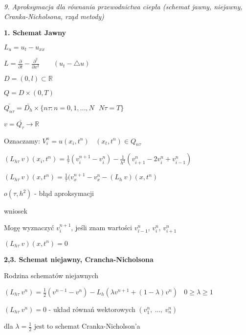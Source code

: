 \textit{9. Aproksymacja dla równania przewodnictwa ciepła (schemat jawny, niejawny, Cranka-Nicholsona, rząd metody)}

\textbf{1. Schemat Jawny}

$L_u = u_t - u_{xx}$

$L = \frac{\partial}{\partial t} - \frac{\partial^2}{\partial x^2}\ \ \ \ \ \ \ \ \ (u_t - \bigtriangleup u)$

$D = (0,l) \subset \mathbb{R}$

$Q = D \times (0,T)$

$\bar{Q_{n\tau}} = \bar{D_h} \times \{ n\tau : n = 0, 1, ..., N\ \ \ N\tau = T\}$

$v = \bar{Q_\tau} \rightarrow \mathbb{R}$

Oznaczamy: $V^n_i = u(x_i,t^n)\ \ \ \ (x_t,t^n) \in Q_{n\tau}$

$(L_{h\tau}\ v)(x_i, t^n) = \frac{1}{\tau} (v^{n+1}_i - v^n_i) - \frac{1}{h^2} (v^n_{i+1} - 2v^n_i + v^n_{i-1})$

$(L_{h\tau}\ v)(x, t^n) = \frac{1}{\tau} (v^{n+1}_x - v^n_x - (L_h\ v)(x, t^n)$

$o(\tau, h^2)$ - błąd aproksymacji

wniosek

Mogę wyznaczyć $v^{n+1}_i$, jeśli znam wartości $v^{n}_{i-1}$, $v^{n}_{i}$, $v^{n}_{i+1}$

$(L_{h\tau}\ v)(x, t^n) = 0$

\textbf{2,3. Schemat niejawny, Crancha-Nicholsona}

Rodzina schematów niejawnych

$(L_{h\tau}\ v^n) = \frac{1}{2} (v^{n-1} - v^{n}) - L_h (\lambda v^{n+1} + (1-\lambda)v^{n})\ \ \ \ 0 \geqslant \lambda \geqslant 1$

$(L_{h\tau}\ v^n) = 0$ - układ równań wektorowych $(v^n_1,\ ...,\ v^n_n)$

dla $\lambda = \frac{1}{2}$ jest to schemat Cranka-Nicholson'a

